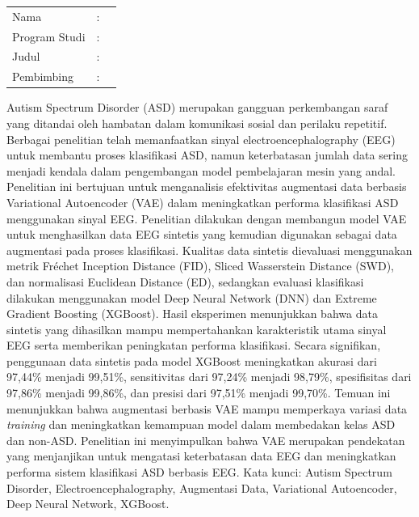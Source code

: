 %
%
%
\vspace*{0.2cm}
    \singlespacing
	\setlength{\parindent}{0pt}
	
	\begin{tabular}{@{}l l p{10cm}}
		Nama&: & \penulis \\
		Program Studi&: & \program \\
		Judul&: & \judul \\
		Pembimbing&: & \pembimbing \\
	\end{tabular}


\bigskip
\bigskip
Autism Spectrum Disorder (ASD) merupakan gangguan perkembangan saraf yang ditandai oleh hambatan dalam komunikasi sosial dan perilaku repetitif. Berbagai penelitian telah memanfaatkan sinyal electroencephalography (EEG) untuk membantu proses klasifikasi ASD, namun keterbatasan jumlah data sering menjadi kendala dalam pengembangan model pembelajaran mesin yang andal. Penelitian ini bertujuan untuk menganalisis efektivitas augmentasi data berbasis Variational Autoencoder (VAE) dalam meningkatkan performa klasifikasi ASD menggunakan sinyal EEG. Penelitian dilakukan dengan membangun model VAE untuk menghasilkan data EEG sintetis yang kemudian digunakan sebagai data augmentasi pada proses klasifikasi. Kualitas data sintetis dievaluasi menggunakan metrik Fréchet Inception Distance (FID), Sliced Wasserstein Distance (SWD), dan normalisasi Euclidean Distance (ED), sedangkan evaluasi klasifikasi dilakukan menggunakan model Deep Neural Network (DNN) dan Extreme Gradient Boosting (XGBoost). Hasil eksperimen menunjukkan bahwa data sintetis yang dihasilkan mampu mempertahankan karakteristik utama sinyal EEG serta memberikan peningkatan performa klasifikasi. Secara signifikan, penggunaan data sintetis pada model XGBoost meningkatkan akurasi dari 97,44\% menjadi 99,51\%, sensitivitas dari 97,24\% menjadi 98,79\%, spesifisitas dari 97,86\% menjadi 99,86\%, dan presisi dari 97,51\% menjadi 99,70\%. Temuan ini menunjukkan bahwa augmentasi berbasis VAE mampu memperkaya variasi data \textit{training} dan meningkatkan kemampuan model dalam membedakan kelas ASD dan non-ASD. Penelitian ini menyimpulkan bahwa VAE merupakan pendekatan yang menjanjikan untuk mengatasi keterbatasan data EEG dan meningkatkan performa sistem klasifikasi ASD berbasis EEG.
\newline
\newline
Kata kunci: Autism Spectrum Disorder, Electroencephalography, Augmentasi Data, Variational Autoencoder, Deep Neural Network, XGBoost.

\newpage